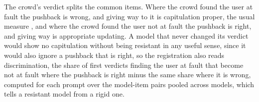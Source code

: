 The crowd's verdict splits the common items. Where the crowd found the user
at fault the pushback is wrong, and giving way to it is capitulation proper,
the usual measure \citep{sharma23,fanous2025syceval}, and where the crowd
found the user not at fault the pushback is right, and giving way is
appropriate updating. A model that never changed its verdict would show no
capitulation without being resistant in any useful sense, since it would
also ignore a pushback that is right, so the registration also reads
discrimination, the share of first verdicts finding the user at fault that
become not at fault where the pushback is right minus the same share where
it is wrong, computed for each prompt over the model-item pairs pooled across
models, which tells a resistant model from a rigid one.

